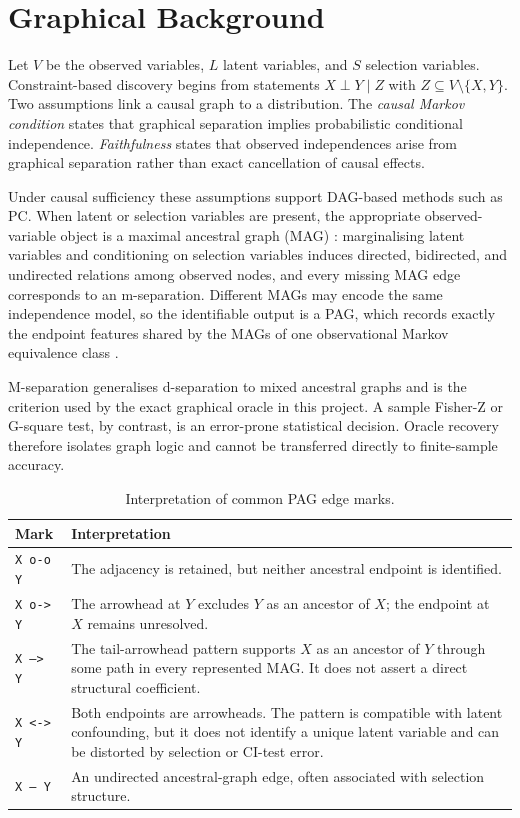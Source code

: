 \documentclass[11pt,a4paper]{article}
\newcommand{\code}[1]{\texttt{#1}}
\begin{document}
\section{Graphical Background}
\label{sec:background}

Let \(V\) be the observed variables, \(L\) latent variables, and \(S\)
selection variables. Constraint-based discovery begins from statements
\(X \perp Y \mid Z\) with \(Z \subseteq V \setminus \{X,Y\}\). Two assumptions
link a causal graph to a distribution. The \emph{causal Markov condition}
states that graphical separation implies probabilistic conditional
independence. \emph{Faithfulness} states that observed independences arise from
graphical separation rather than exact cancellation of causal effects.

Under causal sufficiency these assumptions support DAG-based methods such as
PC. When latent or selection variables are present, the appropriate
observed-variable object is a maximal ancestral graph (MAG)
\citep{richardson2002ancestral}: marginalising latent variables and
conditioning on selection variables induces directed, bidirected, and
undirected relations among observed nodes, and every missing MAG edge
corresponds to an m-separation. Different MAGs may encode the same
independence model, so the identifiable output is a PAG, which records exactly
the endpoint features shared by the MAGs of one observational Markov
equivalence class \citep{zhang2008completeness}.

M-separation generalises d-separation to mixed ancestral graphs and is the
criterion used by the exact graphical oracle in this project. A sample Fisher-Z
or G-square test, by contrast, is an error-prone statistical decision. Oracle
recovery therefore isolates graph logic and cannot be transferred directly to
finite-sample accuracy.

\begin{table}[H]
\caption{Interpretation of common PAG edge marks.}
\label{tab:pag-marks}
\begin{tabularx}{\textwidth}{lY}
\toprule
Mark & Interpretation \\
\midrule
\code{X o-o Y} & The adjacency is retained, but neither ancestral endpoint is
identified. \\
\code{X o-> Y} & The arrowhead at \(Y\) excludes \(Y\) as an ancestor of
\(X\); the endpoint at \(X\) remains unresolved. \\
\code{X --> Y} & The tail-arrowhead pattern supports \(X\) as an ancestor of
\(Y\) through some path in every represented MAG. It does not assert a direct
structural coefficient. \\
\code{X <-> Y} & Both endpoints are arrowheads. The pattern is compatible with
latent confounding, but it does not identify a unique latent variable and can
be distorted by selection or CI-test error. \\
\code{X --- Y} & An undirected ancestral-graph edge, often associated with
selection structure. \\
\bottomrule
\end{tabularx}
\end{table}
\end{document}
